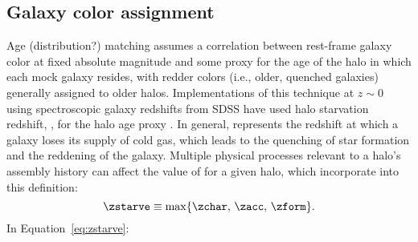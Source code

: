 \documentclass[twocolumn,apj,iop,tighten]{emulateapj2}
\begin{document}
\subsection{Galaxy color assignment}\label{subsec:color_assign}

Age (distribution?) matching assumes a correlation between rest-frame galaxy color at fixed absolute magnitude and some proxy for the age of the halo in which each mock galaxy resides, with redder colors (i.e., older, quenched galaxies) generally assigned to older halos. Implementations of this technique at $z\sim0$ using spectroscopic galaxy redshifts from SDSS have used halo starvation redshift, \zstarve, for the halo age proxy \citep{hearin_watson13, hearin_etal14, safonova_etal21}. In general, \zstarve represents the redshift at which a galaxy loses its supply of cold gas, which leads to the quenching of star formation and the reddening of the galaxy. Multiple physical processes relevant to a halo's assembly history can affect the value of \zstarve for a given halo, which \citet{hearin_watson13} incorporate into this definition:
%
\begin{equation}\label{eq:zstarve}
\zstarve \equiv \max\{\zchar,\, \zacc,\, \zform\}.
\end{equation}
%
\noindent In Equation~\ref{eq:zstarve}:
\end{document}
